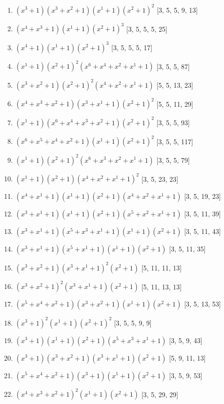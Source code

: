 \documentclass[10pt,twocolumn]{article}
\begin{document}
\begin{enumerate}
\item $(x^{3} + 1)(x^{3} + x^{2} + 1)(x^{1} + 1)(x^{2} + 1)^{2}$  [3, 5, 5, 9, 13]
\item $(x^{4} + x^{3} + 1)(x^{1} + 1)(x^{2} + 1)^{3}$  [3, 5, 5, 5, 25]
\item $(x^{4} + 1)(x^{1} + 1)(x^{2} + 1)^{3}$  [3, 5, 5, 5, 17]
\item $(x^{1} + 1)(x^{2} + 1)^{2}(x^{6} + x^{4} + x^{2} + x^{1} + 1)$  [3, 5, 5, 87]
\item $(x^{3} + x^{2} + 1)(x^{2} + 1)^{2}(x^{4} + x^{2} + x^{1} + 1)$  [5, 5, 13, 23]
\item $(x^{4} + x^{3} + x^{2} + 1)(x^{3} + x^{1} + 1)(x^{2} + 1)^{2}$  [5, 5, 11, 29]
\item $(x^{1} + 1)(x^{6} + x^{4} + x^{3} + x^{2} + 1)(x^{2} + 1)^{2}$  [3, 5, 5, 93]
\item $(x^{6} + x^{5} + x^{4} + x^{2} + 1)(x^{1} + 1)(x^{2} + 1)^{2}$  [3, 5, 5, 117]
\item $(x^{1} + 1)(x^{2} + 1)^{2}(x^{6} + x^{3} + x^{2} + x^{1} + 1)$  [3, 5, 5, 79]
\item $(x^{1} + 1)(x^{2} + 1)(x^{4} + x^{2} + x^{1} + 1)^{2}$  [3, 5, 23, 23]
\item $(x^{4} + x^{1} + 1)(x^{1} + 1)(x^{2} + 1)(x^{4} + x^{2} + x^{1} + 1)$  [3, 5, 19, 23]
\item $(x^{3} + x^{1} + 1)(x^{1} + 1)(x^{2} + 1)(x^{5} + x^{2} + x^{1} + 1)$  [3, 5, 11, 39]
\item $(x^{3} + x^{1} + 1)(x^{5} + x^{3} + x^{1} + 1)(x^{1} + 1)(x^{2} + 1)$  [3, 5, 11, 43]
\item $(x^{3} + x^{1} + 1)(x^{5} + x^{1} + 1)(x^{1} + 1)(x^{2} + 1)$  [3, 5, 11, 35]
\item $(x^{3} + x^{2} + 1)(x^{3} + x^{1} + 1)^{2}(x^{2} + 1)$  [5, 11, 11, 13]
\item $(x^{3} + x^{2} + 1)^{2}(x^{3} + x^{1} + 1)(x^{2} + 1)$  [5, 11, 13, 13]
\item $(x^{5} + x^{4} + x^{2} + 1)(x^{3} + x^{2} + 1)(x^{1} + 1)(x^{2} + 1)$  [3, 5, 13, 53]
\item $(x^{3} + 1)^{2}(x^{1} + 1)(x^{2} + 1)^{2}$  [3, 5, 5, 9, 9]
\item $(x^{3} + 1)(x^{1} + 1)(x^{2} + 1)(x^{5} + x^{3} + x^{1} + 1)$  [3, 5, 9, 43]
\item $(x^{3} + 1)(x^{3} + x^{2} + 1)(x^{3} + x^{1} + 1)(x^{2} + 1)$  [5, 9, 11, 13]
\item $(x^{5} + x^{4} + x^{2} + 1)(x^{3} + 1)(x^{1} + 1)(x^{2} + 1)$  [3, 5, 9, 53]
\item $(x^{4} + x^{3} + x^{2} + 1)^{2}(x^{1} + 1)(x^{2} + 1)$  [3, 5, 29, 29]

\end{enumerate}
\end{document}
